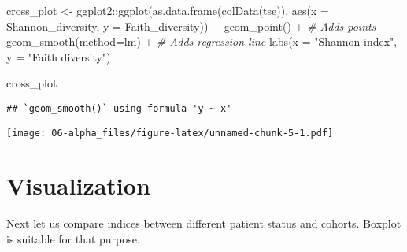 \documentclass[
  oneside]{book}
\newenvironment{Shaded}{\begin{snugshade}}{\end{snugshade}}
\newcommand{\AttributeTok}[1]{\textcolor[rgb]{0.77,0.63,0.00}{#1}}
\newcommand{\CommentTok}[1]{\textcolor[rgb]{0.56,0.35,0.01}{\textit{#1}}}
\newcommand{\FunctionTok}[1]{\textcolor[rgb]{0.00,0.00,0.00}{#1}}
\newcommand{\NormalTok}[1]{#1}
\newcommand{\OtherTok}[1]{\textcolor[rgb]{0.56,0.35,0.01}{#1}}
\newcommand{\SpecialCharTok}[1]{\textcolor[rgb]{0.00,0.00,0.00}{#1}}
\newcommand{\StringTok}[1]{\textcolor[rgb]{0.31,0.60,0.02}{#1}}
\begin{document}
\begin{Shaded}
\begin{Highlighting}[]
\NormalTok{cross\_plot }\OtherTok{\textless{}{-}}\NormalTok{ ggplot2}\SpecialCharTok{::}\FunctionTok{ggplot}\NormalTok{(}\FunctionTok{as.data.frame}\NormalTok{(}\FunctionTok{colData}\NormalTok{(tse)), }
                                     \FunctionTok{aes}\NormalTok{(}\AttributeTok{x =}\NormalTok{ Shannon\_diversity, }\AttributeTok{y =}\NormalTok{ Faith\_diversity)) }\SpecialCharTok{+} 
  \FunctionTok{geom\_point}\NormalTok{() }\SpecialCharTok{+} \CommentTok{\# Adds points}
  \FunctionTok{geom\_smooth}\NormalTok{(}\AttributeTok{method=}\NormalTok{lm) }\SpecialCharTok{+} \CommentTok{\# Adds regression line}
  \FunctionTok{labs}\NormalTok{(}\AttributeTok{x =} \StringTok{"Shannon index"}\NormalTok{, }\AttributeTok{y =} \StringTok{"Faith diversity"}\NormalTok{) }

\NormalTok{cross\_plot}
\end{Highlighting}
\end{Shaded}

\begin{verbatim}
## `geom_smooth()` using formula 'y ~ x'
\end{verbatim}

\texttt{[image: 06-alpha\_files/figure-latex/unnamed-chunk-5-1.pdf]}

\hypertarget{visualization-1}{%
\section{Visualization}\label{visualization-1}}

Next let us compare indices between different patient status and
cohorts. Boxplot is suitable for that purpose.
\end{document}
